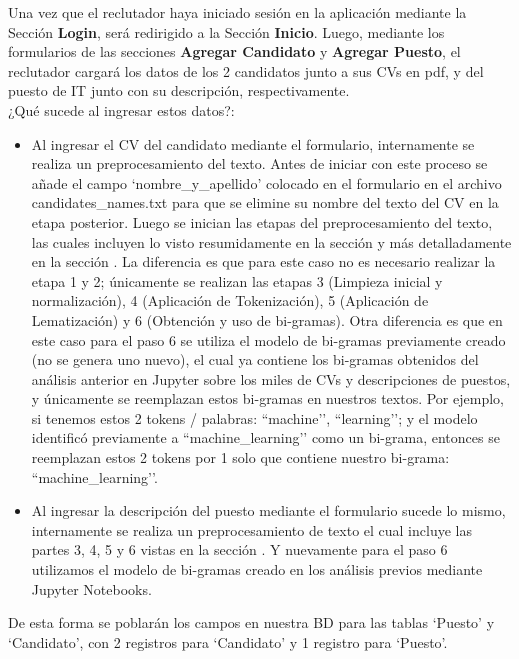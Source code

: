\documentclass[12pt,a4paper]{article}
\begin{document}
\begin{sloppypar}
Una vez que el reclutador haya iniciado sesión en la aplicación mediante la Sección \textbf{Login}, será redirigido a la Sección \textbf{Inicio}. Luego, mediante los formularios de las secciones \textbf{Agregar Candidato} y \textbf{Agregar Puesto}, el reclutador cargará los datos de los 2 candidatos junto a sus CVs en pdf, y del puesto de IT junto con su descripción, respectivamente. \\

¿Qué sucede al ingresar estos datos?:

\begin{itemize}
\item Al ingresar el CV del candidato mediante el formulario, internamente se realiza un preprocesamiento del texto. Antes de iniciar con este proceso se añade el campo ‘nombre\_y\_apellido’ colocado en el formulario en el archivo candidates\_names.txt para que se elimine su nombre del texto del CV en la etapa posterior. Luego se inician las etapas del preprocesamiento del texto, las cuales incluyen lo visto resumidamente en la sección \textit{} y más detalladamente en la sección \textit{}. La diferencia es que para este caso no es necesario realizar la etapa 1 y 2; únicamente se realizan las etapas 3 (Limpieza inicial y normalización), 4 (Aplicación de Tokenización), 5 (Aplicación de Lematización) y 6 (Obtención y uso de bi-gramas). Otra diferencia es que en este caso para el paso 6 se utiliza el modelo de bi-gramas previamente creado (no se genera uno nuevo), el cual ya contiene los bi-gramas obtenidos del análisis anterior en Jupyter sobre los miles de CVs y descripciones de puestos, y únicamente se reemplazan estos bi-gramas en nuestros textos. Por ejemplo, si tenemos estos 2 tokens / palabras: ``machine’’, ``learning’’; y el modelo identificó previamente a ``machine\_learning’’ como un bi-grama, entonces se reemplazan estos 2 tokens por 1 solo que contiene nuestro bi-grama: ``machine\_learning’’. 
\item Al ingresar la descripción del puesto mediante el formulario sucede lo mismo, internamente se realiza un preprocesamiento de texto el cual incluye las partes 3, 4, 5 y 6 vistas en la sección \textit{}. Y nuevamente para el paso 6 utilizamos el modelo de bi-gramas creado en los análisis previos mediante Jupyter Notebooks. 
\end{itemize}

\cleardoublepage

De esta forma se poblarán los campos en nuestra BD para las tablas ‘Puesto’ y ‘Candidato’, con 2 registros para ‘Candidato’ y 1 registro para ‘Puesto’.  


\end{sloppypar}
\end{document}
